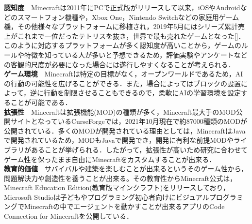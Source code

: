 \textbf{認知度}　Minecraftは2011年にPCで正式版がリリースして以来，iOSやAndroidなどのスマートフォン機種や，Xbox One，Nintendo Switchなどの家庭用ゲーム機，その他様々なプラットフォームに移植され，2019年5月にはシリーズ累計売上がこれまで一位だったテトリスを抜き，世界で最も売れたゲームとなった[]．このように対応するプラットフォームが多く認知度が高いことから，ゲームのルールや特徴を知っている人が多いと予想できるため，評価実験やアンケートなどの客観的尺度が必要になった場合には遂行しやすくなることが考えられる．\\

\textbf{ゲーム環境}　Minecraftは特定の目標がなく，オープンワールドであるため，AIの行動の可能性を広げることができる．また，場合によってはブロックの設置によって，逆に行動を制限させることもできるので，柔軟にAIの学習環境を設定することが可能である．\\

\textbf{拡張性}　Minecraftは拡張機能(MOD)の種類が多く，Minecraft最大手のMOD公開サイトとなっているCurseForgeでは，2021年10月現在で約87000種類のMODが公開されている．多くのMODが開発されている理由としては，MinecraftはJavaで開発されているため，MODもJavaで開発でき，開発に有利な前提MODやライブラリがあることが挙げられる．したがって，拡張性が高いため研究に合わせてゲーム性を保ったまま自由にMinecraftをカスタムすることが出来る．\\

\textbf{教育的価値}　サバイバルや建築を楽しむことが出来るというそのゲーム性から，問題解決力や創造性を養うことが出来る。その教育性からMinecraft公式は，Minecraft Education Edition(教育版マインクラフト)をリリースしており，Microsoft Studioは子どもやプログラミング初心者向けにビジュアルプログラミングでMinecraftの中でエージェントを動かすことが出来るアプリのCode Connection for Minecraftを公開している．\\
